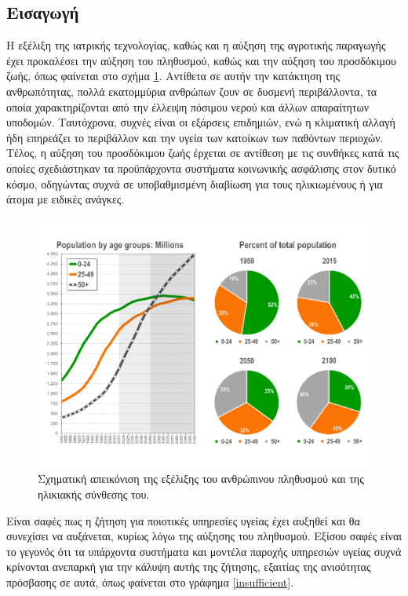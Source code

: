 \subsection{Εισαγωγή}
Η εξέλιξη της ιατρικής τεχνολογίας, καθώς και η αύξηση της αγροτικής παραγωγής έχει προκαλέσει την αύξηση του πληθυσμού, καθώς και την αύξηση του προσδόκιμου ζωής, όπως φαίνεται στο σχήμα \ref{human_population}.
Αντίθετα σε αυτήν την κατάκτηση της ανθρωπότητας, πολλά εκατομμύρια ανθρώπων ζουν σε δυσμενή περιβάλλοντα, τα οποία χαρακτηρίζονται από την έλλειψη πόσιμου νερού και άλλων απαραίτητων υποδομών.
Ταυτόχρονα, συχνές είναι οι εξάρσεις επιδημιών, ενώ η κλιματική αλλαγή ήδη επηρεάζει το περιβάλλον και την υγεία των κατοίκων των παθόντων περιοχών.
Τέλος, η αύξηση του προσδόκιμου ζωής έρχεται σε αντίθεση με τις συνθήκες κατά τις οποίες σχεδιάστηκαν τα προϋπάρχοντα συστήματα κοινωνικής ασφάλισης στον δυτικό κόσμο, οδηγώντας συχνά σε υποβαθμισμένη διαβίωση για τους ηλικιωμένους ή για άτομα με ειδικές ανάγκες.
\begin{figure}[h!]
\includegraphics[scale=0.4]{images/human_population.png}
\centering
\caption{Σχηματική απεικόνιση της εξέλιξης του ανθρώπινου πληθυσμού και της ηλικιακής σύνθεσης του. \cite{human_population}}
\label{human_population}
\end{figure}
Είναι σαφές πως η ζήτηση για ποιοτικές υπηρεσίες υγείας έχει αυξηθεί και θα συνεχίσει να αυξάνεται, κυρίως λόγω της αύξησης του πληθυσμού. \cite{Lubitz2003} 
Εξίσου σαφές είναι το γεγονός ότι τα υπάρχοντα συστήματα και μοντέλα παροχής υπηρεσιών υγείας συχνά κρίνονται ανεπαρκή για την κάλυψη αυτής της ζήτησης, εξαιτίας της ανισότητας πρόσβασης σε αυτά, όπως φαίνεται στο γράφημα \ref{insufficient}. 
